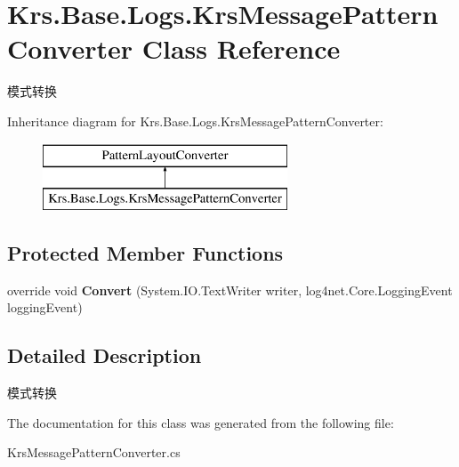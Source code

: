 \hypertarget{class_krs_1_1_base_1_1_logs_1_1_krs_message_pattern_converter}{\section{Krs.\-Base.\-Logs.\-Krs\-Message\-Pattern\-Converter Class Reference}
\label{class_krs_1_1_base_1_1_logs_1_1_krs_message_pattern_converter}
}


模式转换  


Inheritance diagram for Krs.\-Base.\-Logs.\-Krs\-Message\-Pattern\-Converter\-:\begin{figure}[H]
\begin{center}
\leavevmode
\includegraphics[height=2.000000cm]{class_krs_1_1_base_1_1_logs_1_1_krs_message_pattern_converter}
\end{center}
\end{figure}
\subsection*{Protected Member Functions}
\begin{DoxyCompactItemize}
\item 
\hypertarget{class_krs_1_1_base_1_1_logs_1_1_krs_message_pattern_converter_a17e6b4afb9ba9d5babbf7c96fdc16f58}{override void {\bfseries Convert} (System.\-I\-O.\-Text\-Writer writer, log4net.\-Core.\-Logging\-Event logging\-Event)}\label{class_krs_1_1_base_1_1_logs_1_1_krs_message_pattern_converter_a17e6b4afb9ba9d5babbf7c96fdc16f58}

\end{DoxyCompactItemize}


\subsection{Detailed Description}
模式转换 



The documentation for this class was generated from the following file\-:\begin{DoxyCompactItemize}
\item 
Krs\-Message\-Pattern\-Converter.\-cs\end{DoxyCompactItemize}
